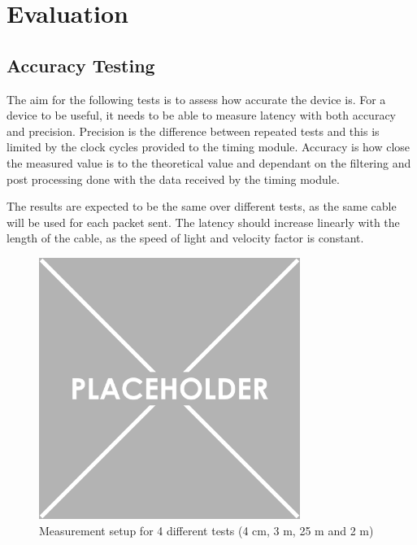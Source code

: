 \chapter{Evaluation}\label{C:eval}

\setlength{\abovedisplayskip}{3pt}
\setlength{\belowdisplayskip}{3pt}

\section{Accuracy Testing}

The aim for the following tests is to assess how accurate the device is. For a device to be useful, it needs to be 
able to measure latency with both accuracy and precision. Precision is the difference between repeated tests and 
this is limited by the clock cycles provided to the timing module. Accuracy is how close the measured value is to 
the theoretical value and dependant on the filtering and post processing done with the data received by the timing 
module. 

The results are expected to be the same over different tests, as the same cable will be used for each packet sent. 
The latency should increase linearly with the length of the cable, as the speed of light and velocity factor is 
constant.

\begin{figure}[H]
    \begin{center}
        \includegraphics[keepaspectratio,height=8.5cm]{Images/TestSetup}
        \caption{Measurement setup for 4 different tests (4 cm, 3 m, 25 m and 2 m)}
        \label{fig:testSetup}
    \end{center}
\end{figure}

